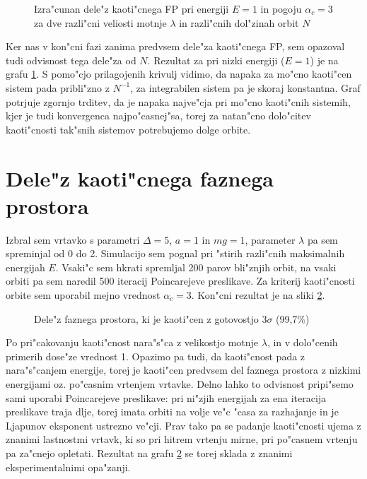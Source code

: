 \documentclass[a4paper,10pt]{article}
\begin{document}
\begin{figure}[H]
 
 \caption{Izra"cunan dele"z kaoti"cnega FP pri energiji $E=1$ in pogoju $\alpha_c = 3$ za dve razli"cni veliosti motnje $\lambda$ in razli"cnih dol"zinah orbit $N$}
 \label{fig:dolzina-kaos}
\end{figure}

Ker nas v kon"cni fazi zanima predvsem dele"za kaoti"cnega FP, sem opazoval tudi odvisnost tega dele"za od $N$. Rezultat za pri nizki energiji ($E=1$) je na grafu \ref{fig:dolzina-kaos}. S pomo"cjo prilagojenih krivulj vidimo, da napaka za mo"cno kaoti"cen sistem pada pribli"zno z $N^{-1}$, za integrabilen sistem pa je skoraj konstantna. Graf potrjuje zgornjo trditev, da je napaka najve"cja pri mo"cno kaoti"cnih sistemih, kjer je tudi konvergenca najpo"casnej"sa, torej za natan"cno dolo"citev kaoti"cnosti tak"snih sistemov potrebujemo dolge orbite. 

\section{Dele"z kaoti"cnega faznega prostora}
Izbral sem vrtavko s parametri $\Delta = 5$, $a=1$ in $mg = 1$, parameter $\lambda$ pa sem spreminjal od 0 do 2. Simulacijo sem pognal pri "stirih razli"cnih maksimalnih energijah $E$. Vsaki"c sem hkrati spremljal 200 parov bli"znjih orbit, na vsaki orbiti pa sem naredil 500 iteracij Poincarejeve preslikave. Za kriterij kaoti"cnosti orbite sem uporabil mejno vrednost $\alpha_c=3$. Kon"cni rezultat je na sliki \ref{fig:kaos}. 

\begin{figure}[H]
 \label{fig:kaos}
 
  \caption{Dele"z faznega prostora, ki je kaoti"cen z gotovostjo $3\sigma$ (99,7\%)}
\end{figure}

Po pri"cakovanju kaoti"cnost nara"s"ca z velikostjo motnje $\lambda$, in v dolo"cenih primerih dose"ze vrednost 1. Opazimo pa tudi, da kaoti"cnost pada z nara"s"canjem energije, torej je kaoti"cen predvsem del faznega prostora z nizkimi energijami oz. po"casnim vrtenjem vrtavke. Delno lahko to odvisnost pripi"semo sami uporabi Poincarejeve preslikave: pri ni"zjih energijah za ena iteracija preslikave traja dlje, torej imata orbiti na volje ve"c "casa za razhajanje in je Ljapunov eksponent ustrezno ve"cji. Prav tako pa se padanje kaoti"cnosti ujema z znanimi lastnostmi vrtavk, ki so pri hitrem vrtenju mirne, pri po"casnem vrtenju pa za"cnejo opletati. Rezultat na grafu \ref{fig:kaos} se torej sklada z znanimi eksperimentalnimi opa"zanji. 
\end{document}
